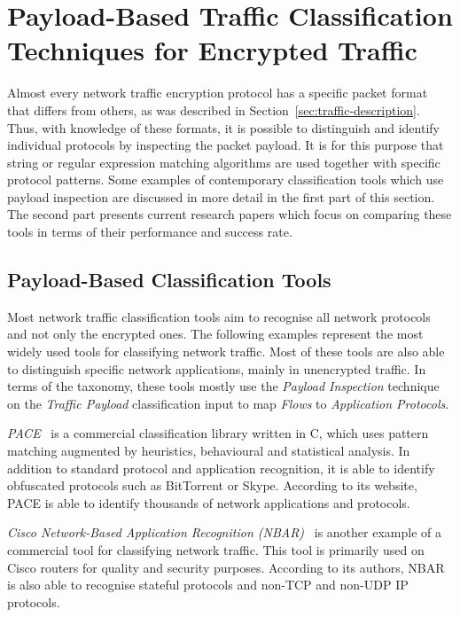 

\section{Payload-Based Traffic Classification Techniques for Encrypted Traffic}\label{sec:payload-classification}


Almost every network traffic encryption protocol has a specific packet format that differs from others, as was described in Section~\ref{sec:traffic-description}. Thus, with knowledge of these formats, it is possible to distinguish and identify individual protocols by inspecting the packet payload. It is for this purpose that string or regular expression matching algorithms are used together with specific protocol patterns. Some examples of contemporary classification tools which use payload inspection are discussed in more detail in the first part of this section. The second part presents current research papers which focus on comparing these tools in terms of their performance and success rate.


\subsection{Payload-Based Classification Tools}

Most network traffic classification tools aim to recognise all network protocols and not only the encrypted ones. The following examples represent the most widely used tools for classifying network traffic. Most of these tools are also able to distinguish specific network applications, mainly in unencrypted traffic. In terms of the taxonomy, these tools mostly use the \textit{Payload Inspection} technique on the \textit{Traffic Payload} classification input to map \textit{Flows} to \textit{Application Protocols}.

\textit{PACE}~\cite{pace} is a commercial classification library written in C, which uses pattern matching augmented by heuristics, behavioural and statistical analysis. In addition to standard protocol and application recognition, it is able to identify obfuscated protocols such as BitTorrent or Skype. According to its website, PACE is able to identify thousands of network applications and protocols.

\textit{Cisco Network-Based Application Recognition (NBAR)}~\cite{CiscoSystems--Network} is another example of a commercial tool for classifying network traffic. This tool is primarily used on Cisco routers for quality and security purposes. According to its authors, NBAR is also able to recognise stateful protocols and non-TCP and non-UDP IP protocols.

